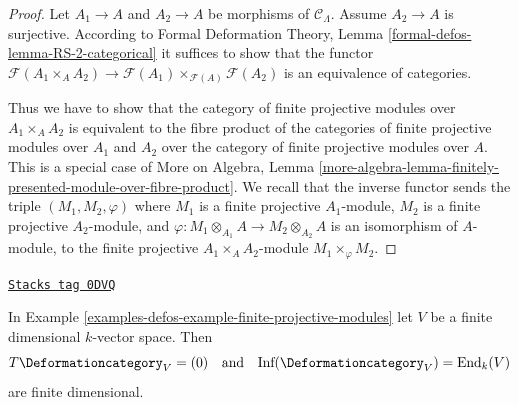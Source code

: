 \begin{proof}
Let $A_1 \to A$ and $A_2 \to A$ be morphisms of $\mathcal{C}_\Lambda$.
Assume $A_2 \to A$ is surjective. According to
Formal Deformation Theory, Lemma
\ref{formal-defos-lemma-RS-2-categorical}
it suffices to show that the functor
$\mathcal{F}(A_1 \times_A A_2) \to
\mathcal{F}(A_1) \times_{\mathcal{F}(A)} \mathcal{F}(A_2)$
is an equivalence of categories.

\medskip\noindent
Thus we have to show that the category of finite projective modules
over $A_1 \times_A A_2$ is equivalent to the fibre product
of the categories of finite projective modules over $A_1$ and $A_2$
over the category of finite projective modules over $A$.
This is a special case of More on Algebra, Lemma
\ref{more-algebra-lemma-finitely-presented-module-over-fibre-product}.
We recall that the inverse functor sends the triple
$(M_1, M_2, \varphi)$ where
$M_1$ is a finite projective $A_1$-module,
$M_2$ is a finite projective $A_2$-module, and
$\varphi : M_1 \otimes_{A_1} A \to M_2 \otimes_{A_2} A$
is an isomorphism of $A$-module, to the finite projective
$A_1 \times_A A_2$-module $M_1 \times_\varphi M_2$.
\end{proof}

\begin{lemma}
\label{examples-defos-lemma-finite-projective-modules-TI}
\href{https://stacks.math.columbia.edu/tag/0DVQ}{\texttt{Stacks tag 0DVQ}}

In Example \ref{examples-defos-example-finite-projective-modules}
let $V$ be a finite dimensional $k$-vector space. Then
$$
T\Deformationcategory_V = (0)
\quad\text{and}\quad
\text{Inf}(\Deformationcategory_V) = \text{End}_k(V)
$$
are finite dimensional.
\end{lemma}

